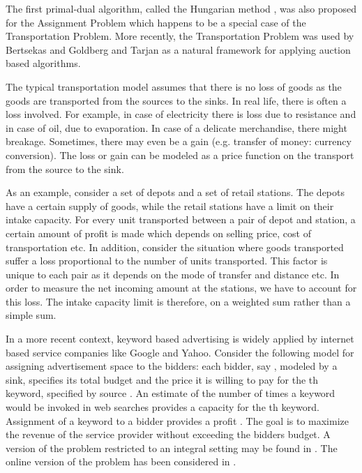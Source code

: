 \documentclass[11pt]{article}
\begin{document}
The first primal-dual algorithm, called the Hungarian method \cite{Kuhn55Hungarian}, 
was also proposed for 
the Assignment Problem which happens to be a 
special case of the Transportation Problem. More
recently, the Transportation Problem was used by 
Bertsekas \cite{bertsekastutorial} and 
Goldberg and Tarjan  \cite{goldberg87solving} as a natural framework for applying 
auction based algorithms. 

The typical transportation model assumes that there is no loss of goods as the goods are 
transported from the sources to the sinks. In real life, there is often a loss involved. 
For example, in case of  electricity there is loss due to resistance and in case of oil, 
due to evaporation. In case of a delicate merchandise, there might breakage. 
Sometimes, there may even be a gain (e.g. transfer of money: currency conversion).
The loss or gain can be modeled as a price function on the transport from the 
source to the sink.

As an example, consider  a set of depots and a set of retail stations. 
The depots have a certain supply of goods, 
while the retail stations have a limit on their intake capacity.
For every unit transported between a pair of depot and station, 
a certain amount of profit is made
which depends on selling price, cost of transportation etc. 
In addition, consider the situation where goods transported 
suffer a loss 
proportional to the number of units transported.
This factor is unique to each pair as it depends on
the mode of transfer and distance etc. 
In order to measure the net incoming amount at
the stations, we have to account for this loss. 
The intake capacity limit is therefore, on a weighted
sum rather than a simple sum.    

In a more recent context, keyword based advertising is widely applied by 
internet based service companies like Google and
Yahoo. Consider the following model for assigning advertisement space to the 
bidders: each bidder, say , modeled by a sink,
specifies its total budget  and the price  it is willing to pay 
for the th keyword, specified by  source .
An estimate of the number of times a keyword would be invoked in web 
searches provides a capacity  for the th keyword.
Assignment of a keyword  to a bidder  provides a profit .
The goal is to maximize the revenue of the service provider without exceeding the bidders budget.
A version of the problem restricted to an integral setting may be 
found in \cite{andelman04auctions}.
The online version of the problem has been considered in \cite{mehta05adwords}.
\end{document}
